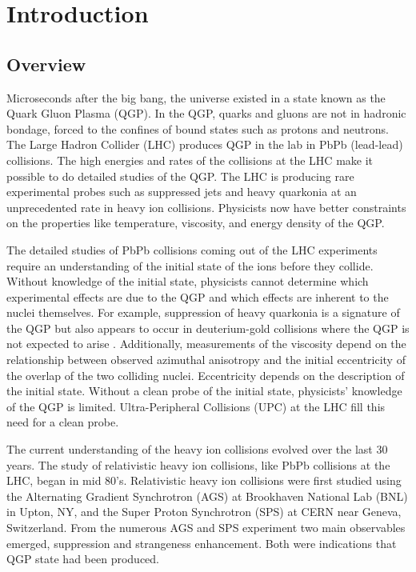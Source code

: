\chapter{Introduction}
  \section{Overview}
  Microseconds after the big bang, the universe existed in a state known as
    the Quark Gluon Plasma (QGP).
  In the QGP, quarks and gluons are not in hadronic bondage, forced to 
    the confines of bound states such as protons and neutrons.
  The Large Hadron Collider (LHC) produces QGP in the lab in PbPb (lead-lead)
    collisions.
  The high energies and rates of the collisions at the LHC make it possible 
    to do detailed studies of the QGP. 
  The LHC is producing rare experimental probes such as suppressed jets and 
    heavy quarkonia at an unprecedented rate in heavy ion collisions. 
  Physicists now have better constraints on the properties like temperature,
    viscosity, and energy density of the QGP.

  The detailed studies of PbPb collisions coming out of the LHC 
    experiments require an understanding of the initial state of the ions 
    before they collide.
  Without knowledge of the initial state, physicists cannot determine which
    experimental effects are due to the QGP and which effects are inherent to
    the nuclei themselves. 
  For example, suppression of heavy quarkonia is a signature of the QGP 
    but also appears to occur in deuterium-gold collisions where the QGP is not
    expected to arise \cite{dAuOniaPHENIX}. 
  Additionally, measurements of the viscosity depend on the relationship 
    between observed azimuthal anisotropy and the initial eccentricity of the 
    overlap of the two colliding nuclei. 
  Eccentricity depends on the description of the initial state. 
  Without a clean probe of the initial state, physicists' knowledge of the 
    QGP is limited.
  Ultra-Peripheral Collisions (UPC) at the LHC fill this need for a clean 
    probe.

  The current understanding of the heavy ion collisions evolved over the
    last 30 years.
  The study of relativistic heavy ion collisions, like PbPb collisions at 
    the LHC, began in mid 80's.
  Relativistic heavy ion collisions were first studied using the 
    Alternating Gradient Synchrotron (AGS) at Brookhaven National Lab (BNL) 
    in Upton, NY, and the Super Proton Synchrotron (SPS) at CERN near 
    Geneva, Switzerland. 
  From the numerous AGS and SPS experiment two main observables emerged,
    \JPsi{} suppression and strangeness enhancement. 
  Both were indications that QGP state had been produced.

